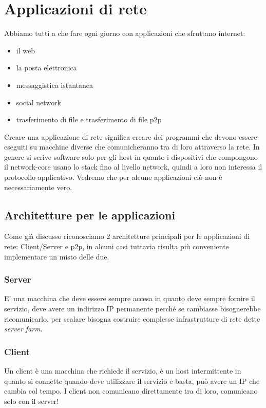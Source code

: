 \section{Applicazioni di rete}
Abbiamo tutti a che fare ogni giorno con applicazioni che sfruttano internet:
\begin{itemize}
    \item il web
    \item la posta elettronica
    \item messaggistica istantanea
    \item social network
    \item trasferimento di file e trasferimento di file p2p
\end{itemize}

Creare una applicazione di rete significa creare dei programmi che devono essere eseguiti su macchine diverse che comunicheranno tra di loro attraverso la rete.
In genere si scrive software solo per gli host in quanto i dispositivi che compongono il network-core usano lo stack fino al livello network, quindi a loro non interessa il protocollo applicativo.
Vedremo che per alcune applicazioni ciò non è necessariamente vero.

\subsection{Architetture per le applicazioni}
Come già discusso riconosciamo 2 architetture principali per le applicazioni di rete: Client/Server e p2p, in alcuni casi tuttavia risulta più conveniente implementare un misto delle due.

\subsubsection{Server}
E' una macchina che deve essere sempre accesa in quanto deve sempre fornire il servizio, deve avere un indirizzo IP permanente perché se cambiasse bisognerebbe ricomunicarlo, per scalare bisogna costruire complesse infrastrutture di rete dette \emph{server farm}.

\subsubsection{Client}
Un client è una macchina che richiede il servizio, è un host intermittente in quanto si connette quando deve utilizzare il servizio e basta, può avere un IP che cambia col tempo.
I client non comunicano direttamente tra di loro, comunicano solo con il server!

